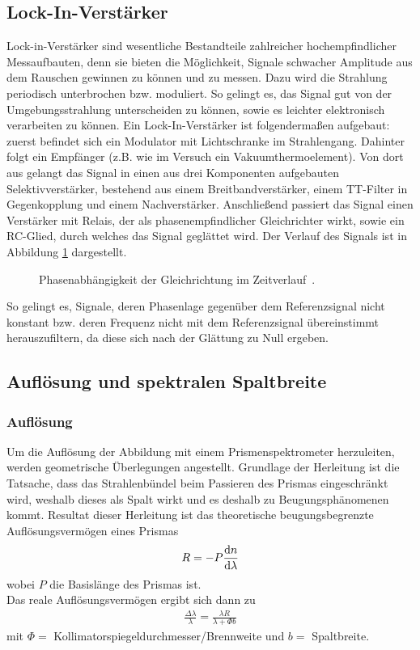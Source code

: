 \documentclass[a4paper,twoside,final]{article}
\begin{document}
\subsection{Lock-In-Verstärker}
Lock-in-Verstärker sind wesentliche Bestandteile zahlreicher hochempfindlicher Messaufbauten, denn sie bieten die Möglichkeit, Signale schwacher Amplitude aus dem Rauschen gewinnen zu können und zu messen.
Dazu wird die Strahlung periodisch unterbrochen bzw. moduliert. So gelingt es, das Signal gut von der Umgebungsstrahlung unterscheiden zu können, sowie es leichter elektronisch verarbeiten zu können. Ein Lock-In-Verstärker ist folgendermaßen aufgebaut: zuerst befindet sich ein Modulator mit Lichtschranke im Strahlengang. Dahinter folgt ein Empfänger (z.B. wie im Versuch ein Vakuumthermoelement). Von dort aus gelangt das Signal in einen aus drei Komponenten aufgebauten Selektivverstärker, bestehend aus einem Breitbandverstärker, einem TT-Filter in Gegenkopplung und einem Nachverstärker. Anschließend passiert das Signal einen Verstärker mit Relais, der als phasenempfindlicher Gleichrichter wirkt, sowie ein RC-Glied, durch welches das Signal geglättet wird. Der Verlauf des Signals ist in Abbildung \ref{fig:Lock-Inn} dargestellt.

\begin{figure}[ht]
    \centering
    
    \caption{Phasenabhängigkeit der Gleichrichtung im Zeitverlauf~\cite{Forker}.}
    \label{fig:Lock-Inn}
\end{figure}

So gelingt es, Signale, deren Phasenlage gegenüber dem Referenzsignal nicht konstant bzw. deren Frequenz nicht mit dem Referenzsignal übereinstimmt herauszufiltern, da diese sich nach der Glättung zu Null ergeben.

\subsection{Auflösung und spektralen Spaltbreite}\label{sec:spektraleSpaltbreite}
\subsubsection{Auflösung}
Um die Auflösung der Abbildung mit einem Prismenspektrometer herzuleiten, werden geometrische Überlegungen angestellt. Grundlage der Herleitung ist die Tatsache, dass das Strahlenbündel beim Passieren des Prismas eingeschränkt wird, weshalb dieses als Spalt wirkt und es deshalb zu Beugungsphänomenen kommt. Resultat dieser Herleitung ist das theoretische beugungsbegrenzte Auflösungsvermögen eines Prismas
\begin{align}
  R = - P \dv{n}{\lambda}
\end{align}
wobei $P$ die Basislänge des Prismas ist. \\
Das reale Auflösungsvermögen ergibt sich dann zu
\begin{align}
  \frac{\Delta\lambda}{\lambda}=\frac{\lambda R}{\lambda+\Phi b}
\end{align}
mit $\Phi =$ Kollimatorspiegeldurchmesser/Brennweite und $b=$ Spaltbreite.
\end{document}
